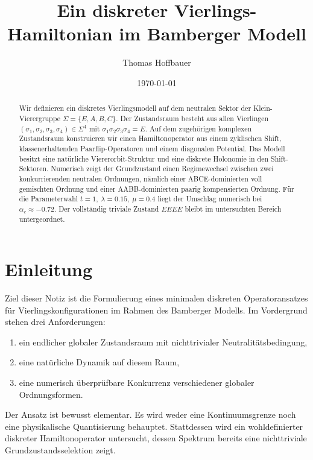 \documentclass[11pt,a4paper]{article}
\title{Ein diskreter Vierlings-Hamiltonian im Bamberger Modell}
\author{Thomas Hoffbauer}
\date{\today}
\newcommand{\SigmaBM}{\Sigma}
\begin{document}
	\maketitle
	
	\begin{abstract}
		Wir definieren ein diskretes Vierlingsmodell auf dem neutralen Sektor der Klein-Vierergruppe
		\(
		\SigmaBM=\{E,A,B,C\}.
		\)
		Der Zustandsraum besteht aus allen Vierlingen
		\(
		(\sigma_1,\sigma_2,\sigma_3,\sigma_4)\in\SigmaBM^4
		\)
		mit
		\(
		\sigma_1\sigma_2\sigma_3\sigma_4=E.
		\)
		Auf dem zugehörigen komplexen Zustandsraum konstruieren wir einen Hamiltonoperator aus einem zyklischen Shift, klassenerhaltenden Paarflip-Operatoren und einem diagonalen Potential. Das Modell besitzt eine natürliche Viererorbit-Struktur und eine diskrete Holonomie in den Shift-Sektoren. Numerisch zeigt der Grundzustand einen Regimewechsel zwischen zwei konkurrierenden neutralen Ordnungen, nämlich einer ABCE-dominierten voll gemischten Ordnung und einer AABB-dominierten paarig kompensierten Ordnung. Für die Parameterwahl
		\(
		t=1,\ \lambda=0.15,\ \mu=0.4
		\)
		liegt der Umschlag numerisch bei
		\(
		\alpha_c\approx -0.72.
		\)
		Der vollständig triviale Zustand \(EEEE\) bleibt im untersuchten Bereich untergeordnet.
	\end{abstract}
	
	\section{Einleitung}
	
	Ziel dieser Notiz ist die Formulierung eines minimalen diskreten Operatoransatzes für Vierlingskonfigurationen im Rahmen des Bamberger Modells. Im Vordergrund stehen drei Anforderungen:
	
	\begin{enumerate}[label=(\roman*)]
		\item ein endlicher globaler Zustandsraum mit nichttrivialer Neutralitätsbedingung,
		\item eine natürliche Dynamik auf diesem Raum,
		\item eine numerisch überprüfbare Konkurrenz verschiedener globaler Ordnungsformen.
	\end{enumerate}
	
	Der Ansatz ist bewusst elementar. Es wird weder eine Kontinuumsgrenze noch eine physikalische Quantisierung behauptet. Stattdessen wird ein wohldefinierter diskreter Hamiltonoperator untersucht, dessen Spektrum bereits eine nichttriviale Grundzustandsselektion zeigt.
	
\end{document}
